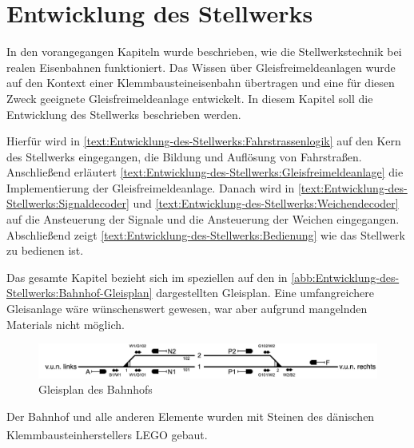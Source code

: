 \chapter{Entwicklung des Stellwerks}\label{text:Entwicklung-des-Stellwerks}

In den vorangegangen Kapiteln wurde beschrieben, wie die Stellwerkstechnik bei realen Eisenbahnen funktioniert. Das Wissen über Gleisfreimeldeanlagen wurde auf den Kontext einer Klemmbausteineisenbahn übertragen und eine für diesen Zweck geeignete Gleisfreimeldeanlage entwickelt. In diesem Kapitel soll die Entwicklung des Stellwerks beschrieben werden.

Hierfür wird in \autoref{text:Entwicklung-des-Stellwerks:Fahrstrassenlogik}  auf den Kern des Stellwerks eingegangen, die Bildung und Auflösung von Fahrstraßen. Anschließend erläutert \autoref{text:Entwicklung-des-Stellwerks:Gleisfreimeldeanlage}  die Implementierung der Gleisfreimeldeanlage. Danach wird in \autoref{text:Entwicklung-des-Stellwerks:Signaldecoder}  und \autoref{text:Entwicklung-des-Stellwerks:Weichendecoder}  auf die Ansteuerung der Signale und die Ansteuerung der Weichen eingegangen. Abschließend zeigt \autoref{text:Entwicklung-des-Stellwerks:Bedienung}  wie das Stellwerk zu bedienen ist.

Das gesamte Kapitel bezieht sich im speziellen auf den in \autoref{abb:Entwicklung-des-Stellwerks:Bahnhof-Gleisplan} dargestellten Gleisplan. Eine umfangreichere Gleisanlage wäre wünschenswert gewesen, war aber aufgrund mangelnden Materials nicht möglich.

\begin{figure}[H]
    \centering
    \includegraphics[width=\textwidth]{Assets/Images/5-Entwicklung-des-Stellwerks/Bahnhof-Gleisplan.png}
    \caption{Gleisplan des Bahnhofs}\label{abb:Entwicklung-des-Stellwerks:Bahnhof-Gleisplan}
\end{figure}

Der Bahnhof und alle anderen Elemente wurden mit Steinen des dänischen Klemmbausteinherstellers LEGO\textsuperscript{\tiny{\textregistered}} gebaut.

